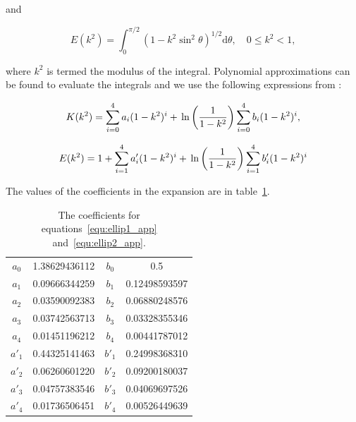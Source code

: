 \documentclass[12pt]{article}
\begin{document}
and

\begin{equation}
\label{equ:ellip2}
E(k^{2}) = \int_{0}^{\pi/2} (1 - k^{2} \sin^{2}\theta)^{1/2} \mathrm{d}\theta, \quad 0 \leq k^{2} < 1,
\end{equation}


where $k^{2}$ is termed the modulus of the integral. Polynomial approximations can be found to evaluate the integrals \citep{Roumeliotis00} and we use the following expressions from \citet{Abramowitz72}:

\begin{equation}
\label{equ:ellip1_app}
K(k^{2}) = \sum_{i = 0}^{4} a_{i} (1 - k^{2})^{i} + \\\ln\left(\frac{1}{1 - k^{2}} \right) \sum_{i = 0}^{4} b_{i} (1 - k^{2})^{i},
\end{equation}

\begin{equation}
\label{equ:ellip2_app}
E(k^{2}) = 1 + \sum_{i = 1}^{4} a'_{i} (1 - k^{2})^{i} + \\\ln\left(\frac{1}{1 - k^{2}} \right) \sum_{i = 1}^{4} b'_{i} (1 - k^{2})^{i}
\end{equation}

The values of the coefficients in the expansion are in table~\ref{tab:ellip_poly_coeff}.

\begin{table}
\caption{\label{tab:ellip_poly_coeff} The coefficients for equations~\ref{equ:ellip1_app} and~\ref{equ:ellip2_app}.}
\begin{center}
\begin{tabular}{|c|c|c|c|}
\hline
$a_{0}$ & 1.38629436112 & $b_{0}$ & 0.5 \\
$a_{1}$ & 0.09666344259 & $b_{1}$ & 0.12498593597 \\
$a_{2}$ & 0.03590092383 & $b_{2}$ & 0.06880248576 \\
$a_{3}$ & 0.03742563713 & $b_{3}$ & 0.03328355346 \\
$a_{4}$ & 0.01451196212 & $b_{4}$ & 0.00441787012 \\
\hline
$a'_{1}$ & 0.44325141463 & $b'_{1}$ & 0.24998368310 \\
$a'_{2}$ & 0.06260601220 & $b'_{2}$ & 0.09200180037 \\
$a'_{3}$ & 0.04757383546 & $b'_{3}$ & 0.04069697526 \\
$a'_{4}$ & 0.01736506451 & $b'_{4}$ & 0.00526449639 \\
\hline
\end{tabular}
\end{center} 
\end{table}
\end{document}
